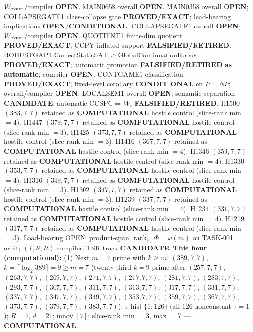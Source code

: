 \documentclass[11pt]{article}
\begin{document}
$W_{\rm exact}$/compiler \textbf{OPEN}.
MAIN0658 overall \textbf{OPEN}.
MAIN0358 overall \textbf{OPEN}; COLLAPSEGATE1 class-collapse gate \textbf{PROVED/EXACT};
load-bearing implications \textbf{OPEN}/\textbf{CONDITIONAL}.
COLLAPSEGATE1 overall \textbf{OPEN}; $W_{\rm exact}$/compiler \textbf{OPEN}.
QUOTIENT1 finite-dim quotient \textbf{PROVED/EXACT}; COPY-inflated support \textbf{FALSIFIED/RETIRED}.
ROBUSTGAP1 CorrectStaticSAT$\not\Rightarrow$GlobalContinuationRobust \textbf{PROVED/EXACT};
automatic promotion \textbf{FALSIFIED/RETIRED as automatic}; compiler \textbf{OPEN}.
CONTGAME1 classification \textbf{PROVED/EXACT}; fixed-level corollary \textbf{CONDITIONAL} on $P=NP$;
overall/compiler \textbf{OPEN}.
LOCALSEM1 overall \textbf{OPEN}; semantic-separation \textbf{CANDIDATE}; automatic CCSPC$\Rightarrow W_i$
\textbf{FALSIFIED/RETIRED}.
H1500 $(383,7,7)$ retained as \textbf{COMPUTATIONAL} hostile control (slice-rank min $=4$).
H1447 $(379,7,7)$ retained as \textbf{COMPUTATIONAL} hostile control (slice-rank min $=3$).
H1425 $(373,7,7)$ retained as \textbf{COMPUTATIONAL} hostile control (slice-rank min $=3$).
H1416 $(367,7,7)$ retained as \textbf{COMPUTATIONAL} hostile control (slice-rank min $=4$).
H1346 $(359,7,7)$ retained as \textbf{COMPUTATIONAL} hostile control (slice-rank min $=4$).
H1330 $(353,7,7)$ retained as \textbf{COMPUTATIONAL} hostile control (slice-rank min $=4$).
H1316 $(349,7,7)$ retained as \textbf{COMPUTATIONAL} hostile control (slice-rank min $=3$).
H1302 $(347,7,7)$ retained as \textbf{COMPUTATIONAL} hostile control (slice-rank min $=3$).
H1239 $(337,7,7)$ retained as \textbf{COMPUTATIONAL} hostile control (slice-rank min $=4$).
H1234 $(331,7,7)$ retained as \textbf{COMPUTATIONAL} hostile control (slice-rank min $=4$).
H1219 $(317,7,7)$ retained as \textbf{COMPUTATIONAL} hostile control (slice-rank min $=3$).
Load-bearing OPEN: product-span $\operatorname{rank}_{\mathbb F_2}\Phi=\omega(m)$ on TASK-001 orbit;
$(T,S,R)$ compiler. TSR track \textbf{CANDIDATE}.
\textbf{This hour (computational):}
(1) Next $m{=}7$ prime with $k{\ge}m$: $(389,7,7)$, $k{=}\lceil\log_2 389\rceil=9{\ge}m{=}7$
(twenty-third $k{=}9$ prime after $(257,7,7)$, $(263,7,7)$, $(269,7,7)$, $(271,7,7)$, $(277,7,7)$, $(281,7,7)$, $(283,7,7)$, $(293,7,7)$, $(307,7,7)$, $(311,7,7)$, $(313,7,7)$, $(317,7,7)$, $(331,7,7)$, $(337,7,7)$, $(347,7,7)$, $(349,7,7)$, $(353,7,7)$, $(359,7,7)$, $(367,7,7)$, $(373,7,7)$, $(379,7,7)$, $(383,7,7)$):
$\tau$-hist $\{1{:}126\}$ (all $126$ nonconstant $\tau{=}1$); $R{=}7$, $d{=}21$; innov $[7]$;
slice-rank min $=3$, max $=7$ --- \textbf{COMPUTATIONAL}.
\end{document}
